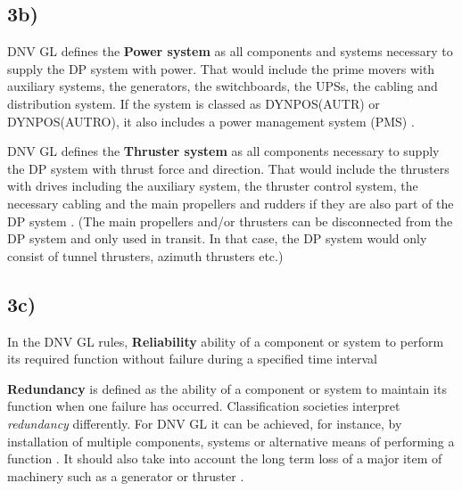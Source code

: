 \subsection*{3b)} \label{sec:3b}
DNV GL defines the \textbf{Power system} as all components and systems necessary to supply the DP system with power. That would include the prime movers with auxiliary systems, the generators, the switchboards, the UPSs, the cabling and distribution system. If the system is classed as DYNPOS(AUTR) or DYNPOS(AUTRO), it also includes a power management system (PMS) \cite{RulesShipsDNVGLPart6Chap3}.  


DNV GL defines the \textbf{Thruster system} as all components necessary to supply the DP system with thrust force and direction. That would include the thrusters with drives including the auxiliary system, the thruster control system, the necessary cabling and the main propellers and rudders if they are also part of the DP system \cite{RulesShipsDNVGLPart6Chap3}. (The main propellers and/or thrusters can be disconnected from the DP system and only used in transit. In that case, the DP system would only consist of tunnel thrusters, azimuth thrusters etc.)




\subsection*{3c)}

In the DNV GL rules, \textbf{Reliability} ability of a component or system to perform its required function without failure during a specified time interval

\textbf{Redundancy} is defined as the ability of a component or system to maintain its function when one failure has occurred.
Classification societies interpret \textit{redundancy} differently. For DNV GL it can be achieved, for instance, by installation of multiple components, systems or alternative means of performing a function \cite{RulesShipsDNVGLPart6Chap3}. It should also take into account the long term loss of a major item of machinery such as a generator or thruster \cite{RecommendedPractices_DP_DNVGL}. 


